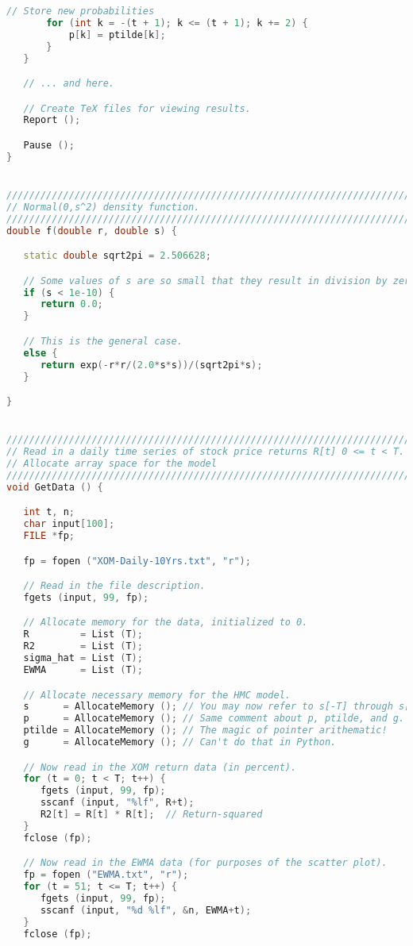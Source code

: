 \documentclass{report}
\begin{document}
\begin{lstlisting}[language=C++]
       // Store new probabilities
       for (int k = -(t + 1); k <= (t + 1); k += 2) {
           p[k] = ptilde[k];
       }
   }

   // ... and here.

   // Create TeX files for viewing results.
   Report ();

   Pause ();
}


////////////////////////////////////////////////////////////////////////////////
// Normal(0,s^2) density function.
////////////////////////////////////////////////////////////////////////////////
double f(double r, double s) {

   static double sqrt2pi = 2.506628;

   // Some values of s are so small that they result in division by zero below.
   if (s < 1e-10) {
      return 0.0;
   }

   // This is the general case.
   else {
      return exp(-r*r/(2.0*s*s))/(sqrt2pi*s);
   }

}


////////////////////////////////////////////////////////////////////////////////
// Read in a daily time series of stock price returns R[t] 0 <= t < T.
// Allocate array space for the model
////////////////////////////////////////////////////////////////////////////////
void GetData () {

   int t, n;
   char input[100];
   FILE *fp;

   fp = fopen ("XOM-Daily-10Yrs.txt", "r");

   // Read in the file description.
   fgets (input, 99, fp);

   // Allocate memory for the data, initialized to 0.
   R         = List (T);
   R2        = List (T);
   sigma_hat = List (T);
   EWMA      = List (T);

   // Allocate necessary memory for the HMC model.
   s      = AllocateMemory (); // You may now refer to s[-T] through s[T].
   p      = AllocateMemory (); // Same comment about p, ptilde, and g.
   ptilde = AllocateMemory (); // The magic of pointer arithematic!
   g      = AllocateMemory (); // Can't do that in Python.

   // Now read in the XOM return data (in percent).
   for (t = 0; t < T; t++) {
      fgets (input, 99, fp);
      sscanf (input, "%lf", R+t);
      R2[t] = R[t] * R[t];  // Return-squared
   }
   fclose (fp);

   // Now read in the EWMA data (for purposes of the scatter plot).
   fp = fopen ("EWMA.txt", "r");
   for (t = 51; t <= T; t++) {
      fgets (input, 99, fp);
      sscanf (input, "%d %lf", &n, EWMA+t);
   }
   fclose (fp);


\end{lstlisting}
\end{document}
